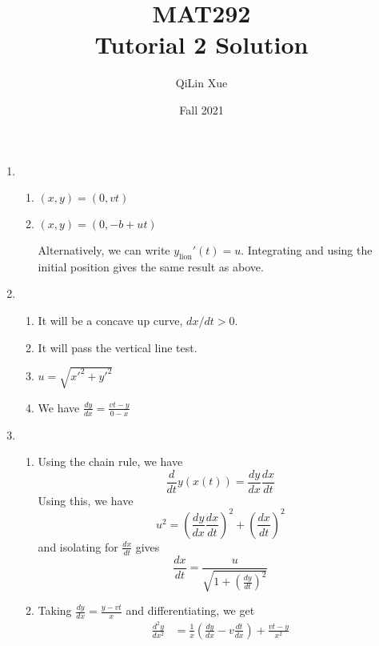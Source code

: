 \documentclass{article}
\title{MAT292 \\ Tutorial 2 Solution}
\author{QiLin Xue}
\date{Fall 2021}
\begin{document}
\newcommand{\tabitem}{~~\llap{\textbullet}~~}

\maketitle
\begin{enumerate}
    \item \begin{enumerate}
        \item $(x,y) = (0, vt)$
        \item $(x,y) = (0,-b + ut)$
        
        Alternatively, we can write $y_\text{lion}'(t) = u$. Integrating and using the initial position gives the same result as above.
    \end{enumerate}
    \item \begin{enumerate}
        \item It will be a concave up curve, $dx/dt > 0.$
        \item It will pass the vertical line test.
        \item $u=\sqrt{x'^2+y'^2}$
        \item We have $\frac{dy}{dx} = \frac{vt-y}{0-x}$
    \end{enumerate}
    \item \begin{enumerate}
        \item Using the chain rule, we have 
        \begin{equation}
            \frac{d}{dt}y(x(t)) = \frac{dy}{dx} \frac{dx}{dt}
        \end{equation}
        Using this, we have
        \begin{equation}
            u^2 = \left(\frac{dy}{dx}\frac{dx}{dt}\right)^2+\left(\frac{dx}{dt}\right)^2
        \end{equation}
        and isolating for $\frac{dx}{dt}$ gives 
        \begin{equation}
            \boxed{\frac{dx}{dt} = \frac{u}{\sqrt{1+\left(\frac{dy}{dt}\right)^2}}}
        \end{equation}
        \item Taking $\frac{dy}{dx}=\frac{y-vt}{x}$ and differentiating, we get
        \begin{align}
            \frac{d^2y}{dx^2} &= \frac{1}{x}\left(\frac{dy}{dx}-v\frac{dt}{dx}\right) + \frac{vt-y}{x^2} \\ 

\end{align}
\end{enumerate}
\end{enumerate}
\end{document}
